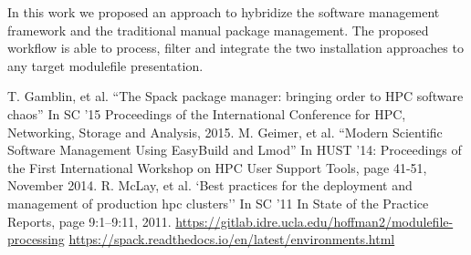 \documentclass[conference]{IEEEtran}
\begin{document}
In this work we proposed an approach to hybridize the software management framework and the traditional manual package management.
The proposed workflow is able to process, filter and integrate the two installation approaches to any target modulefile presentation. 

\begin{thebibliography}{00}
 T. Gamblin, et al. ``The Spack package manager: bringing order to HPC software chaos'' In SC ’15 Proceedings of the International Conference for HPC, Networking, Storage and Analysis, 2015.
 M. Geimer, et al. ``Modern Scientific Software Management Using EasyBuild and Lmod'' In HUST '14: Proceedings of the First International Workshop on HPC User Support Tools, page 41-51, November 2014.
 R. McLay, et al. `Best practices for the deployment and management of production hpc clusters'' In SC ’11 In State of the Practice Reports, page 9:1–9:11, 2011.
 \href{https://gitlab.idre.ucla.edu/hoffman2/modulefile-processing}{https://gitlab.idre.ucla.edu/hoffman2/modulefile-processing}
 \href{https://spack.readthedocs.io/en/latest/environments.html}{https://spack.readthedocs.io/en/latest/environments.html}
\end{thebibliography}
\end{document}
